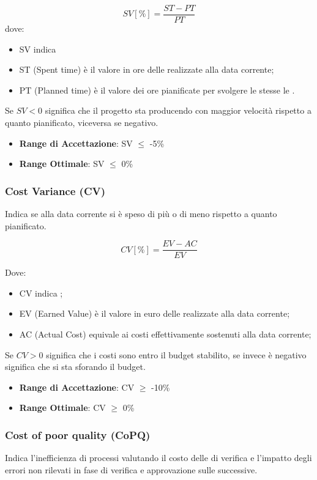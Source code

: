 \documentclass[12pt,a4paper]{article}
\begin{document}
	\[SV [\%] = \frac{ST - PT}{PT}\]
	dove: 
	\begin{itemize}
\item SV indica  
\item ST (Spent time) è il valore in ore delle   realizzate alla data corrente;
\item PT (Planned time) è il valore dei ore pianificate per svolgere le stesse le .
\end{itemize}
 Se $SV < 0$ significa che il progetto sta producendo con maggior velocità rispetto a quanto pianificato, viceversa se negativo.
	
	\begin{itemize}
		\item \textbf{Range di Accettazione}: SV $\leq$ -5\%
		\item \textbf{Range Ottimale}: SV $\leq$ 0\%
	\end{itemize}
	
	\subsubsection{Cost Variance (CV)}
	Indica se alla data corrente si è speso di più o di meno rispetto a quanto pianificato.
	
	\[CV [\%] = \frac{EV - AC}{EV}\]
	
	Dove:\begin{itemize}
		\item CV indica ;
		\item EV (Earned Value) è il valore in euro delle  realizzate alla data corrente;
		\item AC (Actual Cost) equivale ai costi effettivamente sostenuti alla data corrente;
	\end{itemize}  
	
	 Se $CV > 0$ significa che i costi sono entro il budget stabilito, se invece è negativo significa che si sta sforando il budget.
	
	\begin{itemize}
		\item \textbf{Range di Accettazione}: CV $\geq$ -10\%
		\item \textbf{Range Ottimale}: CV $\geq$ 0\%
	\end{itemize}
	
	\subsubsection{Cost of poor quality (CoPQ)}
	Indica l'inefficienza di processi  valutando il costo delle  di verifica e l'impatto degli errori non rilevati in fase di verifica  e approvazione sulle  successive.
\end{document}
